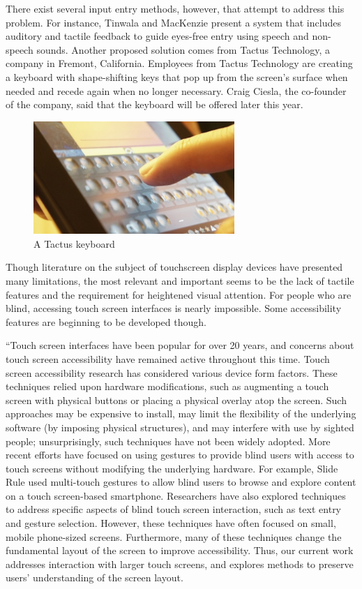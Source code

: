 \documentclass{article}
\begin{document}
There exist several input entry methods, however, that attempt to address this problem. For instance, Tinwala and MacKenzie present a system that includes auditory and tactile feedback to guide eyes-free entry using speech and non-speech sounds. \cite{Tinwala:2010:ETE:1868914.1868972} 
Another proposed solution comes from Tactus Technology, a company in Fremont, California. Employees from Tactus Technology are creating a keyboard with shape-shifting keys that pop up from the screen's surface when needed and recede again when no longer necessary.\cite{Tactus} Craig Ciesla, the co-founder of the company, said that the keyboard will be offered later this year. 

\begin{figure}[ht]
\centering
\includegraphics[width=3in]{tactus-keyboard.jpg} 
\caption{A Tactus keyboard}
\label{figure-sample}
\end{figure}
Though literature on the subject of touchscreen display devices have presented many limitations, the most relevant and important seems to be the lack of tactile features and the requirement for heightened visual attention. For people who are blind, accessing touch screen interfaces is nearly impossible. Some accessibility features are beginning to be developed though.

``Touch screen interfaces have been popular for over 20 years, and concerns about touch screen accessibility have remained active throughout this time.\cite{Buxton:1986:HID:22339.22386} Touch 
screen accessibility research has considered various device 
form factors. These techniques relied upon hardware modifications, 
such as augmenting a touch screen with physical buttons or 
placing a physical overlay atop the screen. Such approaches 
may be expensive to install, may limit the flexibility of the 
underlying software (by imposing physical structures), and 
may interfere with use by sighted people; unsurprisingly, 
such techniques have not been widely adopted. 
More recent efforts have focused on using gestures to 
provide blind users with access to touch screens without 
modifying the underlying hardware. For example, Slide 
Rule\cite{Kane:2008:SRM:1414471.1414487} used multi-touch gestures to allow blind users to 
browse and explore content on a touch screen-based smartphone.  Researchers have also explored techniques to 
address specific aspects of blind touch screen interaction, 
such as text entry and gesture selection\cite{conf/chi/KaneWL11}. 
However, these techniques have often focused on small, 
mobile phone-sized screens. Furthermore, many of these 
techniques change the fundamental layout of the screen to 
improve accessibility. Thus, our current work addresses 
interaction with larger touch screens, and explores methods 
to preserve users’ understanding of the screen layout. 
\end{document}
